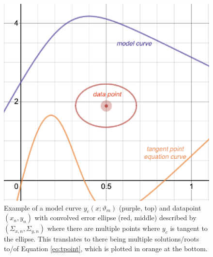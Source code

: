 \begin{figure}
    \centering
    \includegraphics[width=0.6\linewidth]{figures/multtgtexample.eps}
    \caption{Example of a model curve $y_c(x;\vartheta_m)$ (purple, top) and datapoint $(x_n,y_n)$ with convolved error ellipse (red, middle) described by $(\Sigma_{x,n}, \Sigma_{y,n})$ where there are multiple points where $y_c$ is tangent to the ellipse. This translates to there being multiple solutions/roots to/of Equation \eqref{eq:tpoint}, which is plotted in orange at the bottom.}
    \label{fig:multtgt}
\end{figure}
